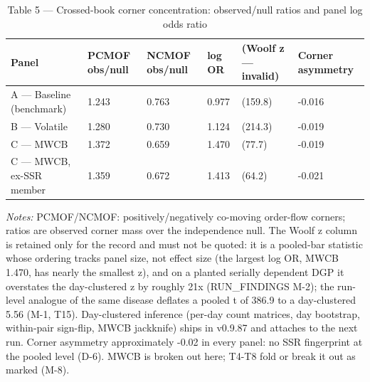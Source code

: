 \begin{table}[htbp]\centering
\caption{Table 5 — Crossed-book corner concentration: observed/null ratios and panel log odds ratio}
\label{tab:t2}
\small
\begin{tabular}{llllll}
\toprule
Panel & PCMOF obs/null & NCMOF obs/null & log OR & (Woolf z — invalid) & Corner asymmetry \\
\midrule
A — Baseline (benchmark) & 1.243 & 0.763 & 0.977 & (159.8) & -0.016 \\
B — Volatile & 1.280 & 0.730 & 1.124 & (214.3) & -0.019 \\
C — MWCB & 1.372 & 0.659 & 1.470 & (77.7) & -0.019 \\
C — MWCB, ex-SSR member & 1.359 & 0.672 & 1.413 & (64.2) & -0.021 \\
\bottomrule
\end{tabular}
\begin{minipage}{\linewidth}\vspace{2pt}\footnotesize\emph{Notes:} PCMOF/NCMOF: positively/negatively co-moving order-flow corners; ratios are observed corner mass over the independence null. The Woolf z column is retained only for the record and must not be quoted: it is a pooled-bar statistic whose ordering tracks panel size, not effect size (the largest log OR, MWCB 1.470, has nearly the smallest z), and on a planted serially dependent DGP it overstates the day-clustered z by roughly 21x (RUN\_FINDINGS M-2); the run-level analogue of the same disease deflates a pooled t of 386.9 to a day-clustered 5.56 (M-1, T15). Day-clustered inference (per-day count matrices, day bootstrap, within-pair sign-flip, MWCB jackknife) ships in v0.9.87 and attaches to the next run. Corner asymmetry approximately -0.02 in every panel: no SSR fingerprint at the pooled level (D-6). MWCB is broken out here; T4-T8 fold or break it out as marked (M-8).\end{minipage}
\end{table}

